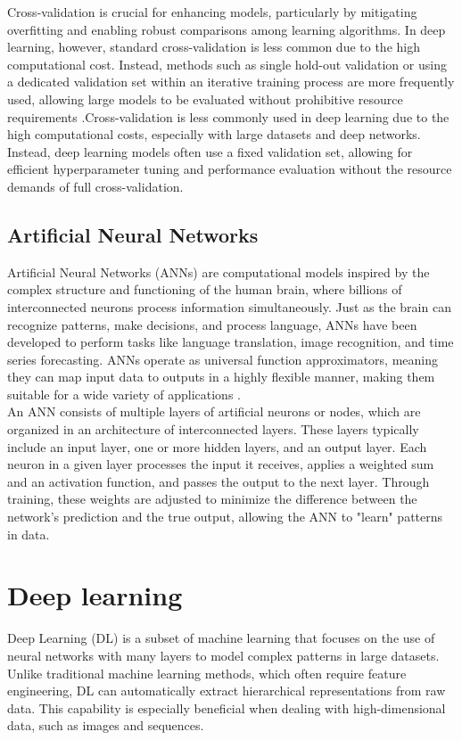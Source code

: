 \documentclass{article}
\begin{document}
Cross-validation is crucial for enhancing models, particularly by mitigating overfitting and enabling robust comparisons among learning algorithms. In deep learning, however, standard cross-validation is less common due to the high computational cost. Instead, methods such as single hold-out validation or using a dedicated validation set within an iterative training process are more frequently used, allowing large models to be evaluated without prohibitive resource requirements \cite{berrar2019cross}.Cross-validation is less commonly used in deep learning due to the high computational costs, especially with large datasets and deep networks. Instead, deep learning models often use a fixed validation set, allowing for efficient hyperparameter tuning and performance evaluation without the resource demands of full cross-validation.


\subsection{Artificial Neural Networks}

Artificial Neural Networks (ANNs) are computational models inspired by the complex structure and functioning of the human brain, where billions of interconnected neurons process information simultaneously. Just as the brain can recognize patterns, make decisions, and process language, ANNs have been developed to perform tasks like language translation, image recognition, and time series forecasting. ANNs operate as universal function approximators, meaning they can map input data to outputs in a highly flexible manner, making them suitable for a wide variety of applications \cite{wang2003artificial}.
\\

An ANN consists of multiple layers of artificial neurons or nodes, which are organized in an architecture of interconnected layers. These layers typically include an input layer, one or more hidden layers, and an output layer. Each neuron in a given layer processes the input it receives, applies a weighted sum and an activation function, and passes the output to the next layer. Through training, these weights are adjusted to minimize the difference between the network’s prediction and the true output, allowing the ANN to "learn" patterns in data.





\section{Deep learning}
Deep Learning (DL) is a subset of machine learning that focuses on the use of neural networks with many layers to model complex patterns in large datasets. Unlike traditional machine learning methods, which often require feature engineering, DL can automatically extract hierarchical representations from raw data. This capability is especially beneficial when dealing with high-dimensional data, such as images and sequences. 
\\
\end{document}

